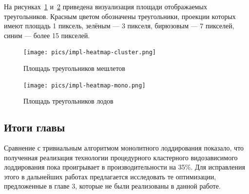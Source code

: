 На рисунках~\ref{fig:impl-heatmap-cluster} и~\ref{fig:impl-heatmap-mono} приведена визуализация площади отображаемых треугольников.
Красным цветом обозначены треугольники, проекции которых имеют площадь 1 пиксель, зелёным --- 3 пикселя, бирюзовым --- 7 пикселей, синим --- более 15 пикселей.

\begin{figure}[ht]
    \texttt{[image: pics/impl-heatmap-cluster.png]}
    \caption{Площадь треугольников мешлетов}
    \label{fig:impl-heatmap-cluster}
\end{figure}

\begin{figure}[ht]
    \texttt{[image: pics/impl-heatmap-mono.png]}
    \caption{Площадь треугольников лодов}
    \label{fig:impl-heatmap-mono}
\end{figure}

\subsection*{Итоги главы}
Сравнение с тривиальным алгоритмом монолитного лоддирования показало, что полученная реализация технологии процедурного кластерного видозависимого лоддирования пока проигрывает в производительности на 35\%.
Для исправления этого в дальнейших работах предлагается исследовать те оптимизации, предложенные в главе 3, которые не были реализованы в данной работе.
